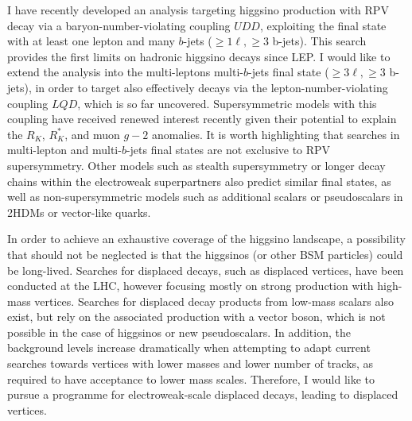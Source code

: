 \hspace{20pt}I have recently developed an analysis targeting higgsino production with RPV decay via a baryon-number-violating coupling $UDD$, exploiting the final state with at least one lepton and many $b$-jets ($\geq 1 \ell, \geq 3$ b-jets).
This search provides the first limits on hadronic higgsino decays since LEP. I would like to extend the analysis into the multi-leptons multi-$b$-jets final state ($\geq 3 \ell, \geq 3$ b-jets), in order to target also effectively decays via the lepton-number-violating coupling $LQD$, which is so far uncovered. 
Supersymmetric models with this coupling have received renewed interest recently given their potential to explain the $R_K$, $R_K^*$, and muon $g-2$ anomalies.
It is worth highlighting that searches in multi-lepton and multi-$b$-jets final states are not exclusive to RPV supersymmetry. Other models such as stealth supersymmetry or longer decay chains within the electroweak superpartners also predict similar final states, as well as non-supersymmetric models such as additional scalars or pseudoscalars in 2HDMs or vector-like quarks.


\hspace{20pt}In order to achieve an exhaustive coverage of the higgsino landscape, a possibility that should not be neglected is that the higgsinos (or other BSM particles) could be long-lived. 
Searches for displaced decays, such as displaced vertices, have been conducted at the LHC, however focusing mostly on strong production with high-mass vertices.
Searches for displaced decay products from low-mass scalars also exist, but rely on the associated production with a vector boson, which is not possible in the case of higgsinos or new pseudoscalars.
In addition, the background levels increase dramatically when attempting to adapt current searches towards vertices with lower masses and lower number of tracks, as required to have acceptance to lower mass scales.
Therefore, I would like to pursue a programme for electroweak-scale displaced decays, leading to displaced vertices. 

